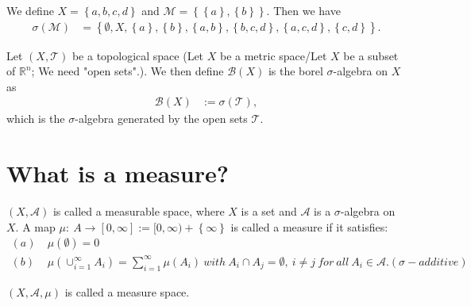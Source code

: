 \documentclass[../../note.tex]{subfiles}
\begin{document}
\begin{example}
    We define $X = \left\{a,b,c,d\right\}$ and $\mathcal{M}=\left\{\left\{a\right\}, \left\{b\right\}\right\}$. Then we have 
    \begin{align}
        \sigma(\mathcal{M})
        &= \left\{\emptyset, X, \left\{a\right\}, \left\{b\right\},\left\{a,b\right\}, \left\{b,c,d\right\},\left\{a,c,d\right\}, \left\{c,d\right\}\right\}.
    \end{align}
\end{example}

\begin{definition}
    Let $(X, \mathcal{T})$ be a topological space (Let $X$ be a metric space/Let $X$ be a subset of $\mathbb{R}^n$; We need "open sets".). We then define $\mathcal{B}(X)$ is the borel $\sigma$-algebra on $X$ as
    \begin{align}
        \mathcal{B}(X)
        &:= \sigma(\mathcal{T}),
    \end{align}
    which is the $\sigma$-algebra generated by the open sets $\mathcal{T}$.
\end{definition}

\section{What is a measure?}
\begin{definition}[Measure]
    $(X, \mathcal{A})$ is called a measurable space, where $X$ is a set and $\mathcal{A}$ is a $\sigma$-algebra on $X$. A map $\mu:~A \rightarrow [0,\infty]:= [0,\infty)+\left\{\infty\right\}$ is called a measure if it satisfies:
    \begin{align}
        (a)~& \mu(\emptyset) = 0 \\
        (b)~& \mu(\cup_{i=1}^{\infty}A_i) = \sum_{i=1}^{\infty} \mu(A_i)~with~A_i \cap A_j = \emptyset,~i \neq j~for~all~A_i \in \mathcal{A}. (\sigma-additive) 
    \end{align}
\end{definition}

\begin{definition}
    $(X,\mathcal{A},\mu)$ is called a measure space.
\end{definition}
\end{document}
